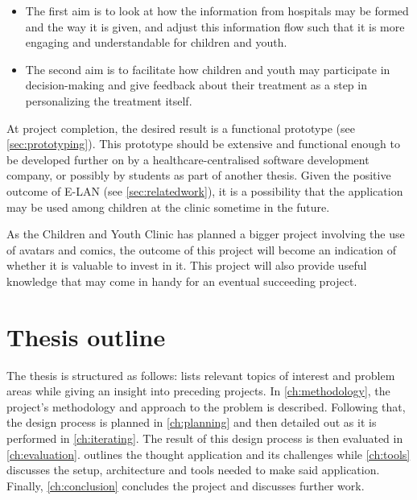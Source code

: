 \begin{itemize}
    \item The first aim is to look at how the information from hospitals may be formed and the way it is given, and adjust this information flow such that it is more engaging and understandable for children and youth.
    \item The second aim is to facilitate how children and youth may participate in decision-making and give feedback about their treatment as a step in personalizing the treatment itself.
\end{itemize}

At project completion, the desired result is a functional prototype (see \autoref{sec:prototyping}). This prototype should be extensive and functional enough to be developed further on by a healthcare-centralised software development company, or possibly by students as part of another thesis. Given the positive outcome of E-LAN (see \autoref{sec:relatedwork}), it is a possibility that the application may be used among children at the clinic sometime in the future.


As the Children and Youth Clinic has planned a bigger project involving the use of avatars and comics, the outcome of this project will become an indication of whether it is valuable to invest in it. This project will also provide useful knowledge that may come in handy for an eventual succeeding project.

\section{Thesis outline}
\label{sec:outline}

The thesis is structured as follows:  lists relevant topics of interest and problem areas while giving an insight into preceding projects. In \autoref{ch:methodology}, the project's methodology and approach to the problem is described. Following that, the design process is planned in \autoref{ch:planning} and then detailed out as it is performed in \autoref{ch:iterating}. The result of this design process is then evaluated in \autoref{ch:evaluation}.  outlines the thought application and its challenges while \autoref{ch:tools} discusses the setup, architecture and tools needed to make said application. Finally, \autoref{ch:conclusion} concludes the project and discusses further work.
